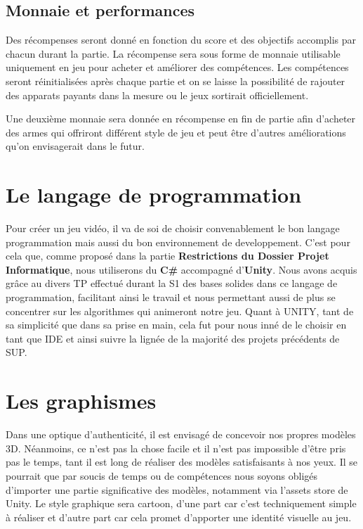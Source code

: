 \documentclass[12pt]{report}
\begin{document}
            \subsection{Monnaie et performances}
                \par Des récompenses seront donné en fonction du score et des objectifs accomplis par chacun durant la partie. La récompense sera sous forme de monnaie utilisable uniquement en jeu pour acheter et améliorer des compétences. Les compétences seront réinitialisées après chaque partie et on se laisse la possibilité de rajouter des apparats payants dans la mesure ou le jeux sortirait officiellement. 
                \par Une deuxième monnaie sera donnée en récompense en fin de partie afin d’acheter des armes qui offriront différent style de jeu et peut être d’autres améliorations qu’on envisagerait dans le futur. 
        \section{Le langage de programmation}
            Pour créer un jeu vidéo, il va de soi de choisir 
            convenablement le bon langage programmation mais 
            aussi du bon environnement de developpement. C'est pour cela que, comme proposé dans la partie \textbf{Restrictions du Dossier Projet Informatique}, nous utiliserons du \textbf{C\#} accompagné d'\textbf{Unity}. Nous avons acquis grâce au divers TP effectué durant la S1 des bases solides dans ce langage de programmation, facilitant ainsi le travail et nous permettant aussi de plus se concentrer sur les algorithmes qui animeront notre jeu.
            Quant à UNITY, tant de sa simplicité que dans sa prise en main, cela fut pour nous inné de le choisir en tant que IDE et ainsi suivre la lignée de la majorité des projets précédents
            de SUP. 
        \section{Les graphismes}
            Dans une optique d'authenticité, il est envisagé de concevoir nos propres modèles 3D. Néanmoins, ce n'est pas la chose facile et il n'est pas impossible d'être pris pas le temps, tant il est long de réaliser des modèles satisfaisants à nos yeux. Il se pourrait que par soucis de temps ou de compétences nous soyons obligés d'importer une partie significative des modèles, notamment via l'assets store de Unity. Le style graphique sera cartoon, d'une part car c'est techniquement simple à réaliser et d'autre part car cela promet d'apporter une identité visuelle au jeu.
\end{document}
